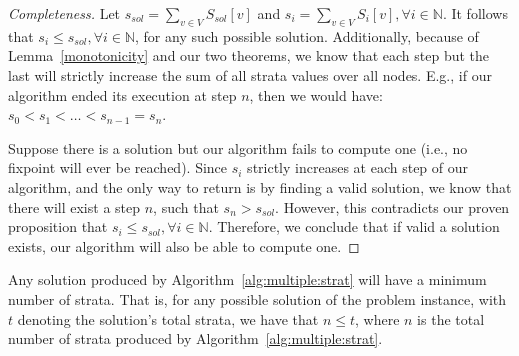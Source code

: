 \begin{proof}[Completeness]

  \noindent
  Let $s_{sol} = \sum_{v \in V} S_{sol}[v]$ and $s_{i} = \sum_{v \in
    V} S_{i}[v], \forall i \in \mathbb{N}$. It follows that $s_i \leq
  s_{sol}, \forall i \in \mathbb{N}$, for any such possible
  solution. Additionally, because of Lemma~\ref{monotonicity} and our
  two theorems, we know
  that each step but the last will strictly increase the sum of all
  strata values over all nodes. E.g., if our algorithm ended its
  execution at step $n$,
  then we would have: $s_0 < s_1 < \ldots < s_{n-1} = s_n$.


  Suppose there is a solution but our algorithm fails to compute one
  (i.e., no fixpoint will ever be reached). Since $s_{i}$ strictly
  increases at each step of our algorithm, and the only way to return
  is by finding a valid solution, we know that there will exist a step
  $n$, such that $s_n > s_{sol}$. However, this contradicts our proven
  proposition that $s_i \leq s_{sol}, \forall i \in
  \mathbb{N}$. Therefore, we conclude that if valid a solution exists,
  our algorithm will also be able to compute one.

\end{proof}

\vfill\eject
\begin{thm}[Principality]
  Any solution produced by Algorithm~\ref{alg:multiple:strat} will
  have a minimum number of strata. That is, for any possible solution
  of the problem instance, with $t$ denoting the solution's total
  strata, we have that $n \leq t$, where $n$ is the total number of
  strata produced by Algorithm~\ref{alg:multiple:strat}.
\end{thm}

